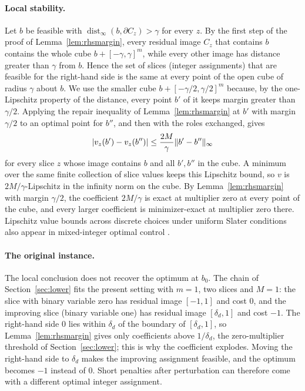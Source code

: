 \paragraph{Local stability.}
Let $b$ be feasible with
$\operatorname{dist}_\infty(b,\partial C_z)>\gamma$ for every $z$. By the
first step of the proof of Lemma~\ref{lem:rhsmargin}, every residual
image $C_z$ that contains $b$ contains the whole cube
$b+[-\gamma,\gamma]^m$, while every other image has distance greater than
$\gamma$ from $b$. Hence the set of slices (integer assignments) that are
feasible for the right-hand side is the same at every point of the open cube
of radius $\gamma$ about $b$. We use the smaller cube
$b+[-\gamma/2,\gamma/2]^m$ because, by the one-Lipschitz property of the
distance, every point $b'$ of it keeps margin greater than $\gamma/2$.
Applying the repair inequality of Lemma~\ref{lem:rhsmargin} at $b'$ with
margin $\gamma/2$ to an optimal point for $b''$, and then with the roles
exchanged, gives
\[
 |v_z(b')-v_z(b'')|\le\frac{2M}\gamma\lVert b'-b''\rVert_\infty
\]
for every slice $z$ whose image contains $b$ and all $b',b''$ in the
cube. A minimum over
the same finite collection of slice values keeps this Lipschitz bound, so
$v$ is $2M/\gamma$-Lipschitz in the infinity norm on the cube. By
Lemma~\ref{lem:rhsmargin} with margin $\gamma/2$, the coefficient
$2M/\gamma$ is exact at multiplier zero at every point of the cube, and
every larger coefficient is minimizer-exact at multiplier zero there.
Lipschitz value bounds across discrete choices under uniform Slater
conditions also appear in mixed-integer optimal control
\citep[Theorem~3]{GugatHante2017}.

\paragraph{The original instance.}
The local conclusion does not recover the optimum at $b_0$. The chain of
Section~\ref{sec:lower} fits the present setting with $m=1$, two slices
and $M=1$: the slice with binary variable zero has residual image
$[-1,1]$ and cost $0$, and the improving slice (binary variable one) has
residual image $[\delta_d,1]$ and cost $-1$. The right-hand side $0$ lies
within $\delta_d$ of the boundary of $[\delta_d,1]$, so
Lemma~\ref{lem:rhsmargin} gives only coefficients above $1/\delta_d$,
the zero-multiplier threshold of Section~\ref{sec:lower}; this is why the
coefficient explodes. Moving the right-hand side to $\delta_d$ makes the
improving assignment feasible, and the optimum becomes $-1$ instead of
$0$. Short penalties after perturbation can therefore come with a
different optimal integer assignment.

